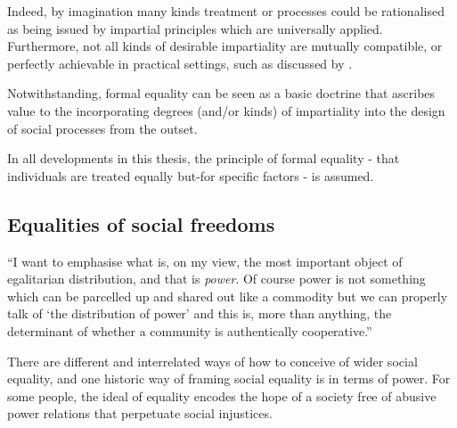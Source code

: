 Indeed, by imagination many kinds treatment or processes could be rationalised as being issued by impartial principles which are universally applied. Furthermore, not all kinds of desirable impartiality are mutually compatible, or perfectly achievable in practical settings, such as discussed by \cite{Hutchinson_2019}.

Notwithstanding, formal equality can be seen as a basic doctrine that ascribes value to the incorporating degrees (and/or kinds) of impartiality into the design of social processes from the outset.%

In all developments in this thesis, the principle of formal equality - that individuals are treated equally but-for specific factors - is assumed.

\subsection{Equalities of social freedoms}

\begin{displayquote}
``I want to emphasise what is, on my view, the most important object of egalitarian distribution, and that is \textit{power}. Of course power is not something which can be parcelled up and shared out like a commodity but we can properly talk of `the distribution of power' and this is, more than anything, the determinant of whether a community is authentically cooperative.'' \citep{TheSocialBasisofEquality:1998}
\end{displayquote}

There are different and interrelated ways of how to conceive of wider social equality, and one historic way of framing social equality is in terms of power.
For some people, the ideal of equality encodes the hope of a society free of abusive power relations that perpetuate social injustices.

